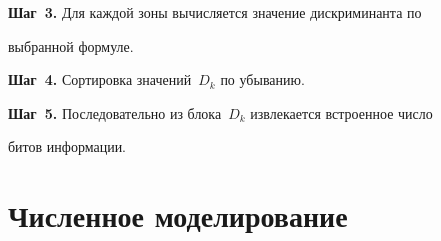   


 \textbf{Шаг~3.} Для каждой зоны вычисляется значение дискриминанта по 


выбранной формуле.


  


 \textbf{Шаг~4.} Сортировка значений~$D_k$ по убыванию. 


  


 \textbf{Шаг~5.} Последовательно из блока~$D_k$ извлекается встроенное число 


битов информации.


  


  \section{Численное моделирование}


  


